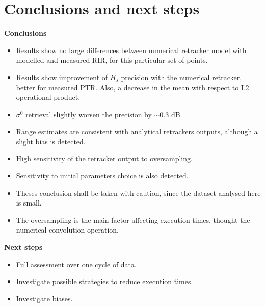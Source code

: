 \documentclass[compress,8pt]{beamer}
\begin{document}
\section{Conclusions and next steps}
 \begin{frame}

 \begin{block}{}
\textbf{Conclusions}
\end{block}
 
\begin{itemize}
\item Results show no large differences between numerical retracker model with modelled and measured RIR, for this particular set of points.
\item Results show improvement of $H_s$ precision with the numerical retracker, better for measured PTR. Also, a decrease in the mean with respect to L2 operational product.

\item $\sigma^0$ retrieval slightly worsen the precision by $\sim 0.3$ dB

\item Range estimates are consistent with analytical retrackers outputs, although a slight bias is detected.

 \item High sensitivity of the retracker output to oversampling.

 \item Sensitivity to initial parameters choice is also detected.
 
  \item Theses conclusion shall be taken with caution, since the dataset analysed here is small.


 \item The oversampling is the main factor affecting execution times, thought the numerical convolution operation.
 
\end{itemize}

\vspace{-0.3cm  }
 \begin{block}{}
\textbf{Next steps}
\end{block}

\begin{itemize}

\item Full assessment over one cycle of data.

\item Investigate possible strategies to reduce execution times.

\item Investigate biases.

\end{itemize}

\end{frame}
\end{document}
